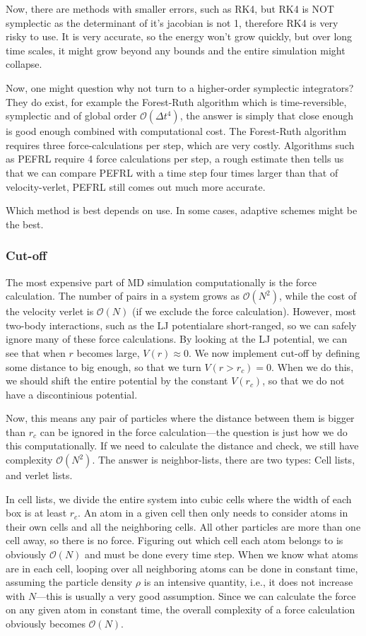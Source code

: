 \documentclass[a4paper, 11pt, notitlepage, english]{article}
\begin{document}
Now, there are methods with smaller errors, such as RK4, but RK4 is NOT symplectic as the determinant of it's jacobian is not 1, therefore RK4 is very risky to use. It is very accurate, so the energy won't grow quickly, but over long time scales, it might grow beyond any bounds and the entire simulation might collapse.

Now, one might question why not turn to a higher-order symplectic integrators? They do exist, for example the Forest-Ruth algorithm which is time-reversible, symplectic and of global order $\mathcal{O}(\Delta t^4)$, the answer is simply that close enough is good enough combined with computational cost. The Forest-Ruth algorithm requires three force-calculations per step, which are very costly. Algorithms such as PEFRL require 4 force calculations per step, a rough estimate then tells us that we can compare PEFRL with a time step four times larger than that of velocity-verlet, PEFRL still comes out much more accurate.

Which method is best depends on use. In some cases, adaptive schemes might be the best.

\subsubsection*{Cut-off}

The most expensive part of MD simulation computationally is the force calculation. The number of pairs in a system grows as $\mathcal{O}(N^2)$, while the cost of the velocity verlet is $\mathcal{O}(N)$ (if we exclude the force calculation). However, most two-body interactions, such as the LJ potentialare short-ranged, so we can safely ignore many of these force calculations. By looking at the LJ potential, we can see that when $r$ becomes large, $V(r)\approx 0$. We now implement cut-off by defining some distance to big enough, so that we turn $V(r>r_c) = 0$. When we do this, we should shift the entire potential by the constant $V(r_c)$, so that we do not have a discontinious potential.

Now, this means any pair of particles where the distance between them is bigger than $r_c$ can be ignored in the force calculation---the question is just how we do this computationally. If we need to calculate the distance and check, we still have complexity $\mathcal{O}(N^2)$. The answer is neighbor-lists, there are two types: Cell lists, and verlet lists.

In cell lists, we divide the entire system into cubic cells where the width of each box is at least $r_c$. An atom in a given cell then only needs to consider atoms in their own cells and all the neighboring cells. All other particles are more than one cell away, so there is no force. Figuring out which cell each atom belongs to is obviously $\mathcal{O}(N)$ and must be done every time step. When we know what atoms are in each cell, looping over all neighboring atoms can be done in constant time, assuming the particle density $\rho$ is an intensive quantity, i.e., it does not increase with $N$---this is usually a very good assumption. Since we can calculate the force on any given atom in constant time, the overall complexity of a force calculation obviously becomes $\mathcal{O}(N)$.
\end{document}
